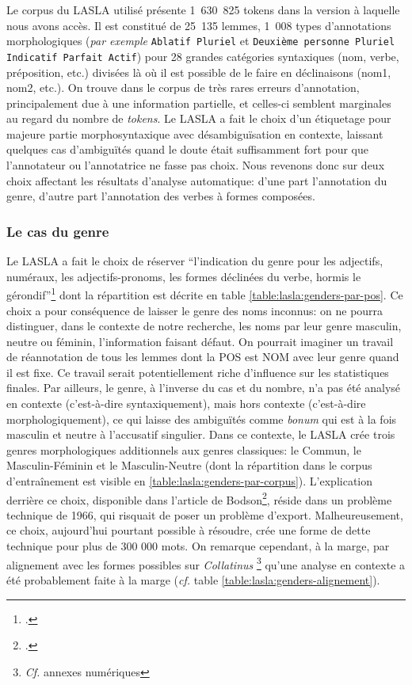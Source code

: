 Le corpus du LASLA utilisé présente 1~630~825 tokens dans la version à laquelle nous avons accès. Il est constitué de 25~135 lemmes, 1~008 types d'annotations morphologiques (\textit{par exemple}  \texttt{Ablatif Pluriel} et \texttt{Deuxième personne Pluriel Indicatif Parfait Actif}) pour 28 grandes catégories syntaxiques (nom, verbe, préposition, etc.) divisées là où il est possible de le faire en déclinaisons (nom1, nom2, etc.). On trouve dans le corpus de très rares erreurs d'annotation, principalement due à une information partielle, et celles-ci semblent marginales au regard du nombre de \textit{tokens}. Le LASLA a fait le choix d'un étiquetage pour majeure partie morphosyntaxique avec désambiguïsation en contexte, laissant quelques cas d'ambiguïtés quand le doute était suffisamment fort pour que l'annotateur ou l'annotatrice ne fasse pas choix. Nous revenons donc sur deux choix affectant les résultats d'analyse automatique: d'une part l'annotation du genre, d'autre part l'annotation des verbes à formes composées.

\subsubsection{Le cas du genre}

Le LASLA a fait le choix de réserver \enquote{l'indication du genre pour les adjectifs, numéraux, les adjectifs-pronoms, les formes déclinées du verbe, hormis le gérondif}\footcite[p.~27]{BodsonCodification1966} dont la répartition est décrite en table \ref{table:lasla:genders-par-pos}. Ce choix a pour conséquence de laisser le genre des noms inconnus: on ne pourra distinguer, dans le contexte de notre recherche, les noms par leur genre masculin, neutre ou féminin, l'information faisant défaut. On pourrait imaginer un travail de réannotation de tous les lemmes dont la POS est NOM avec leur genre quand il est fixe. Ce travail serait potentiellement riche d'influence sur les statistiques finales. Par ailleurs, le genre, à l'inverse du cas et du nombre, n'a pas été analysé en contexte (c'est-à-dire syntaxiquement), mais hors contexte (c'est-à-dire morphologiquement), ce qui laisse des ambiguïtés comme \textit{bonum} qui est à la fois masculin et neutre à l'accusatif singulier. Dans ce contexte, le LASLA crée trois genres morphologiques additionnels aux genres classiques: le Commun, le Masculin-Féminin et le Masculin-Neutre (dont la répartition dans le corpus d'entraînement est visible en \ref{table:lasla:genders-par-corpus}). L'explication derrière ce choix, disponible dans l'article de Bodson\footcite{BodsonCodification1966}, réside dans un problème technique de 1966, qui risquait de poser un problème d'export. Malheureusement, ce choix, aujourd'hui pourtant possible à résoudre, crée une forme de dette technique pour plus de 300 000 mots. On remarque cependant, à la marge, par alignement avec les formes possibles sur \textit{Collatinus} \footnote{\textit{Cf.} annexes numériques} qu'une analyse en contexte a été probablement faite à la marge (\textit{cf.} table \ref{table:lasla:genders-alignement}).

